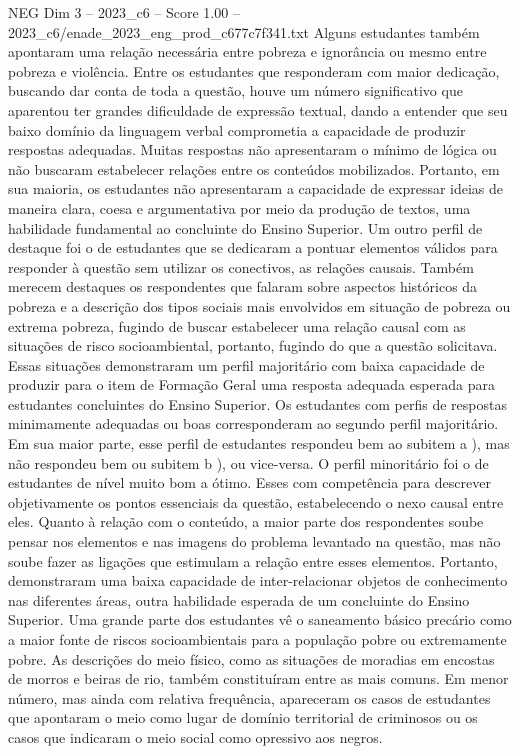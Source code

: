 \begin{textsample}{NEG Dim 3 – 2023\_c6 – Score 1.00 – 2023\_c6/enade\_2023\_eng\_prod\_c677c7f341.txt}
Alguns estudantes também apontaram uma relação necessária entre pobreza e ignorância ou mesmo entre pobreza e violência.
Entre os estudantes que responderam com maior dedicação, buscando dar conta de toda a questão, houve um número significativo que aparentou ter grandes dificuldade de expressão textual, dando a entender que seu baixo domínio da linguagem verbal comprometia a capacidade de produzir respostas adequadas.
Muitas respostas não apresentaram o mínimo de lógica ou não buscaram estabelecer relações entre os conteúdos mobilizados.
Portanto, em sua maioria, os estudantes não apresentaram a capacidade de expressar ideias de maneira clara, coesa e argumentativa por meio da produção de textos, uma habilidade fundamental ao concluinte do Ensino Superior.
Um outro perfil de destaque foi o de estudantes que se dedicaram a pontuar elementos válidos para responder à questão sem utilizar os conectivos, as relações causais.
Também merecem destaques os respondentes que falaram sobre aspectos históricos da pobreza e a descrição dos tipos sociais mais envolvidos em situação de pobreza ou extrema pobreza, fugindo de buscar estabelecer uma relação causal com as situações de risco socioambiental, portanto, fugindo do que a questão solicitava.
Essas situações demonstraram um perfil majoritário com baixa capacidade de produzir para o item de Formação Geral uma resposta adequada esperada para estudantes concluintes do Ensino Superior.
Os estudantes com perfis de respostas minimamente adequadas ou boas corresponderam ao segundo perfil majoritário.
Em sua maior parte, esse perfil de estudantes respondeu bem ao subitem a ), mas não respondeu bem ou subitem b ), ou vice-versa.
O perfil minoritário foi o de estudantes de nível muito bom a ótimo.
Esses com competência para descrever objetivamente os pontos essenciais da questão, estabelecendo o nexo causal entre eles.
Quanto à relação com o conteúdo, a maior parte dos respondentes soube pensar nos elementos e nas imagens do problema levantado na questão, mas não soube fazer as ligações que estimulam a relação entre esses elementos.
Portanto, demonstraram uma baixa capacidade de inter-relacionar objetos de conhecimento nas diferentes áreas, outra habilidade esperada de um concluinte do Ensino Superior.
Uma grande parte dos estudantes vê o saneamento básico precário como a maior fonte de riscos socioambientais para a população pobre ou extremamente pobre.
As descrições do meio físico, como as situações de moradias em encostas de morros e beiras de rio, também constituíram entre as mais comuns.
Em menor número, mas ainda com relativa frequência, apareceram os casos de estudantes que apontaram o meio como lugar de domínio territorial de criminosos ou os casos que indicaram o meio social como opressivo aos negros.

\end{textsample}
